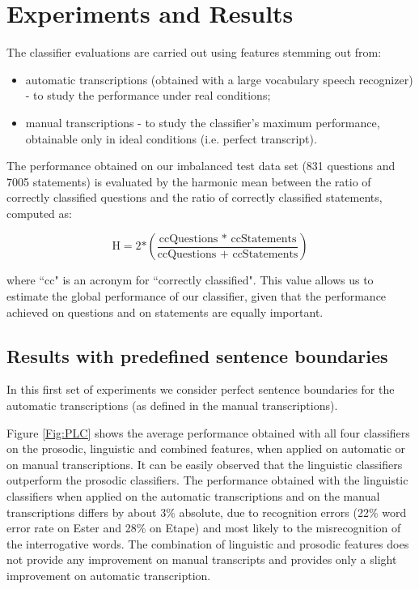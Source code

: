 \documentclass[conference]{IEEEtran}
\begin{document}
\section{Experiments and Results}

The classifier evaluations are carried out using features stemming out from: 

\begin{itemize}
\item automatic transcriptions (obtained with a large vocabulary speech recognizer) - to study the performance under real conditions;
\item manual transcriptions - to study the classifier's maximum performance, obtainable only in ideal conditions (i.e. perfect transcript).
\end{itemize}

The performance obtained on our imbalanced test data set (831 questions and 7005 statements) is evaluated by the harmonic mean between the ratio of correctly classified questions and the ratio of correctly classified statements, computed as: 

\noindent
$$\text{H}=\text{2*}\left(\frac{\text{ccQuestions * ccStatements}}{\text{ccQuestions + ccStatements}}\right)$$

\noindent where ``cc" is an acronym for ``correctly classified".
This value allows us to estimate the global performance of our classifier, given that the performance achieved on questions and on statements are equally important.

\subsection{Results with predefined sentence boundaries}

In this first set of experiments we consider perfect sentence boundaries for the automatic transcriptions (as defined in the manual transcriptions).
 
Figure \ref{Fig:PLC} shows the average performance obtained with all four classifiers on the prosodic, linguistic and combined features, when applied on automatic or on manual transcriptions. 
It can be easily observed that the linguistic classifiers outperform the prosodic classifiers. 
The performance obtained with the linguistic classifiers when applied on the automatic transcriptions and on the manual transcriptions differs by about 3\% absolute, due to recognition errors (22\% word error rate on Ester and 28\% on Etape) and most likely to the misrecognition of the interrogative words.
The combination of linguistic and prosodic features does not provide any improvement on manual transcripts and provides only a slight improvement on automatic transcription.
\end{document}
